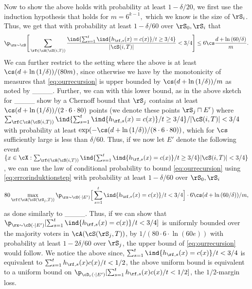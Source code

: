 Now to show the above holds with probability at least $ 1-\delta/20 $, we first use the induction hypothesis that holds for $m=6^{k-1},$ which we know is the size of $ \rS_{i} $. Thus, we get that with probability at least $ 1-\delta/60 $ over $ \rS_{0},\rS_{i} $ that 
\vspace{-0.2cm}
\begin{align}\label{eq:errorinduktionstep}
    \p_{\rx\sim\cD}\Bigg[ \sum_{\rf\in \cA(\cS (i,T))} \frac{\ind\{\sum_{s=1}^{t} \ind\{h_{\rf,s}(x)=c(x)\}/t\geq 3/4\}}{|\cS(i,T)|}
    <3/4\Bigg]\leq 6\cs \frac{d+\ln{\left(60/\delta \right)}}{m}.
  \end{align} 
  \vspace{-0.4cm} \newline We can further restrict to the setting where the above is at least $ \cs (d+\ln{\left(1/\delta \right)})/(80m) $, since otherwise we have by the monotonicity of measures that \cref{eq:ourrecursion} is upper bounded by $ \cs(d+\ln{\left(1/\delta \right)})/m $ as noted by ____. Further, we can with this lower bound, as in the above sketch for ____ show by a Chernoff bound that $ \rS_{j} $ contains at least $ \cs (d+\ln{\left(1/\delta \right)})/(2\cdot6\cdot80) $ points (we denote these points $ \rS_{j}\sqcap E' $) where $ \sum_{\rf\in \cA(\cS (i,T))} \ind\{\sum_{s=1}^{t} \ind\{h_{\rf,s}(x)=c(x)\}/t\geq 3/4\}/|\cS(i,T)|
<3/4 $ with probability at least $ \exp(-\cs (d+\ln{\left(1/\delta \right)})/(8\cdot 6\cdot80)) $, which for $ \cs $ sufficiently large is less than $ \delta/60 $. Thus, if we now let $ E' $ denote the following event  $\{x\in \cX: \sum_{\rf\in \cA(\cS (i,T))}\ind\{\sum_{s=1}^{t} \ind\{h_{\rf,s}(x)=c(x)\}/t\geq 3/4\}|\cS(i,T)|
<3/4 \}$,  we can use the law of conditional probability to bound \cref{eq:ourrecursion} using \cref{eq:errorinduktionstep} with probability at least $ 1-\delta/60 $ over $ \rS_{0},\rS_{i} $  
\vspace{-0.3cm}
\begin{align}\label{eq:laststepininduktionstep}
    80\max_{\rf\in\cA(\cS(\rS_{j},T))}\p_{\rx\sim\cD(\cdot|E')}\Big[ \sum_{s=1}^{t} \ind\{h_{\rf,s}(x)=c(x)\}/t< 3/4\Big] \cdot 6\cs (d+\ln{\left(60/\delta \right)})/m,  
  \end{align} 
  \vspace{-0.4cm} \newline as done similarly to ____. Thus, if we can show that $\p_{\rx\sim\cD(\cdot|E')}[ \sum_{s=1}^{t} \ind\{h_{\rf,s}(x)=c(x)\}/t< 3/4]$ is uniformly bounded over the majority voters in  $ \cA(\cS(\rS_{j},T))$,  by $ 1/(80\cdot 6\cdot \ln{\left(60e \right)}) $ with probability at least $ 1-2\delta/60 $ over $ \rS_{j} $,  the upper bound of \cref{eq:ourrecursion} would follow. We notice the above since, $ \sum_{s=1}^{t} \ind\{h_{\rf,s}(x)=c(x)\}/t< 3/4 $ is equivalent to $ \sum_{s=1}^{t} h_{\rf,s}(x)c(x)/t< 1/2 $, the above uniform bound is equivalent to a uniform bound on  $ \p_{\cD_{c}(\cdot|E')}[\sum_{s=1}^{t} h_{\rf,s}(x)c(x)/t<1/2]$, the $ 1/2 $-margin loss. 
  
